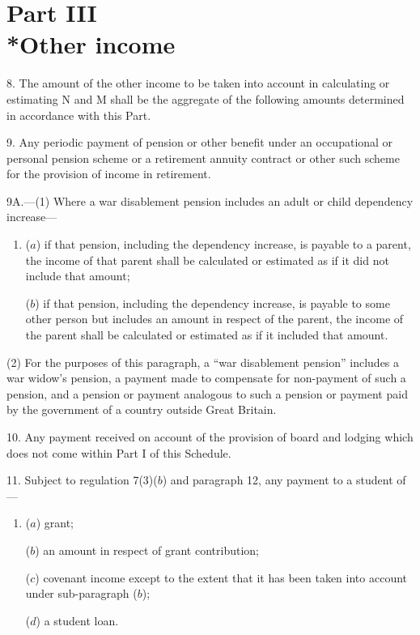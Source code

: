 \documentclass[12pt,a4paper]{article}
\begin{document}
\section[Part III --- Other income]{Part III\\*Other income}

\renewcommand\parthead{--- Schedule 1 Part III}

8.  The amount of the other income to be taken into account in calculating or estimating N and M shall be the aggregate of the following amounts determined in accordance with this Part.

\medskip

9.  Any periodic payment of pension or other benefit under an occupational or personal pension scheme or a retirement annuity contract or other such scheme for the provision of income in retirement.

\medskip

9A.—(1) Where a war disablement pension includes an adult or child dependency increase—
\begin{enumerate}\item[]
($a$) if that pension, including the dependency increase, is payable to a parent, the income of that parent shall be calculated or estimated as if it did not include that amount;

($b$) if that pension, including the dependency increase, is payable to some other person but includes an amount in respect of the parent, the income of the parent shall be calculated or estimated as if it included that amount.
\end{enumerate}

(2) For the purposes of this paragraph, a “war disablement pension” includes a war widow’s pension, a payment made to compensate for non-payment of such a pension, and a pension or payment analogous to such a pension or payment paid by the government of a country outside Great Britain.


\medskip

10.  Any payment received on account of the provision of board and lodging which does not come within Part I of this Schedule.

\medskip

11.  Subject to regulation 7(3)($b$) and paragraph 12, any payment to a student of—
\begin{enumerate}\item[]
($a$) grant;

($b$) an amount in respect of grant contribution;

($c$) covenant income except to the extent that it has been taken into account under sub-paragraph ($b$);

($d$) a student loan.
\end{enumerate}
\end{document}
